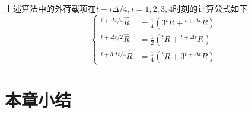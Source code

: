 上述算法中的外荷载项在$t+i\Delta/4,i=1,2,3,4$时刻的计算公式如下
\begin{equation}
\left\{
\begin{aligned}
{^{t+\Delta t/4}\!\hat{R}}&=\frac{1}{4}(3{^t\!R}+{^{t+\Delta t}\!R})\\
{^{t+\Delta t/2}\!\hat{R}}&=\frac{1}{2}({^t\!R}+{^{t+\Delta t}\!R})\\
{^{t+3\Delta t/4}\!\hat{R}}&=\frac{1}{4}({^t\!R}+3{^{t+\Delta t}\!R})
\end{aligned}\right.
\end{equation}

\section{本章小结}

